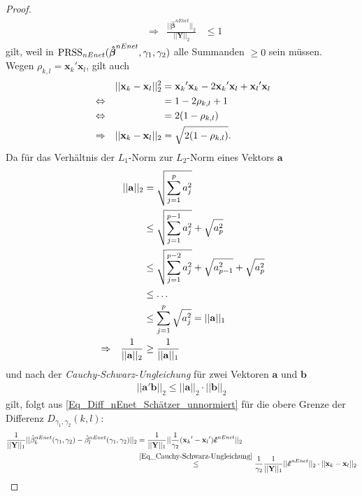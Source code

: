 \documentclass[12pt, a4paper]{report}\usepackage[]{graphicx}\usepackage[]{color}
\begin{document}
\begin{appendix}
\begin{proof}
\begin{align}
&\Rightarrow& \frac{||\boldsymbol{\hat{\beta}}^{nEnet}||_2}{||\mathbf{Y}||_2} &\leq 1
\end{align}
gilt, weil in $\textnormal{PRSS}_{nEnet}(\boldsymbol{\hat{\beta}}^{nEnet}, \gamma_1,\gamma_2)$ alle Summanden $\geq 0$ sein müssen.\\
Wegen $\rho_{k,l} = \mathbf{x}_k{'}\mathbf{x}_l$, gilt auch
\begin{align}\label{Eq_Betrag_Diff_xl_xk}
&& ||\mathbf{x}_k - \mathbf{x}_l||^2_2&=\mathbf{x}_k{'}\mathbf{x}_k - 2\mathbf{x}_k{'}\mathbf{x}_l +\mathbf{x}_l{'}\mathbf{x}_l \notag \\
&\Leftrightarrow& &=1-2\rho_{k,l}+1 \notag \\
&\Leftrightarrow& &=2(1-\rho_{k,l}) \notag \\
&\Rightarrow& ||\mathbf{x}_k - \mathbf{x}_l||_2 &= \sqrt{2(1-\rho_{k,l})}.
\end{align}
Da für das Verhältnis der $L_1$-Norm zur $L_2$-Norm eines Vektors $\mathbf{a}$
\begin{align}\label{Eq_L1_Norm_greater_L2_Norm} 
&& ||\mathbf{a}||_2 &= \sqrt{\sum_{j=1}^{p}a_j^2} \notag \\ 
&& & \leq \sqrt{\sum_{j=1}^{p-1}a_j^2}+\sqrt{a_p^2} \notag \\ 
&& &\leq \sqrt{\sum_{j=1}^{p-2}a_j^2}+\sqrt{a_{p-1}^2}+\sqrt{a_p^2} \notag \\
&& &\leq \dots \notag \\ 
&& &\leq \sum_{j=1}^{p}\sqrt{a_j^2} =||\mathbf{a}||_1 \notag \\
&\Rightarrow& \frac{1}{||\mathbf{a}||_2} &\geq \frac{1}{||\mathbf{a}||_1}
\end{align}
und nach der \textit{Cauchy-Schwarz-Ungleichung} für zwei Vektoren $\mathbf{a}$ und $\mathbf{b}$
\begin{align}\label{Eq_Cauchy-Schwarz-Ungleichung}
||\mathbf{a}'\mathbf{b}||_2 \leq ||\mathbf{a}||_2 \cdot ||\mathbf{b}||_2
\end{align}
gilt, folgt aus
\eqref{Eq_Diff_nEnet_Schätzer_unnormiert} für die obere Grenze der Differenz $D_{\gamma_1,\gamma_2}(k,l)$:
\begin{align*}
\frac{1}{||\mathbf{Y}||_1}||\hat{\beta}_k^{nEnet}(\gamma_1,\gamma_2)-\hat{\beta}_l^{nEnet}(\gamma_1,\gamma_2)||_2 &= \frac{1}{||\mathbf{Y}||_1}|| \frac{1}{\gamma_2} (\mathbf{x}_k{'} - \mathbf{x}_l{'}) \boldsymbol{\hat{\varepsilon}}^{nEnet} ||_2\\
&\stackrel{\eqref{Eq_Cauchy-Schwarz-Ungleichung}}{\leq} \frac{1}{\gamma_2} {\frac{1}{||\mathbf{Y}||_1}} ||\boldsymbol{\hat{\varepsilon}}^{nEnet}||_2 \cdot ||\mathbf{x}_k - \mathbf{x}_l||_2 \\

\end{align*}
\end{proof}
\end{appendix}
\end{document}
